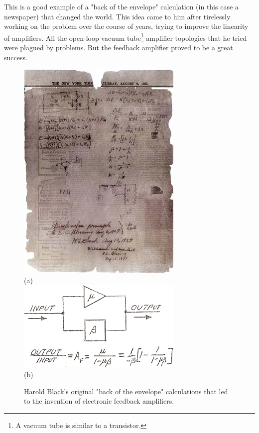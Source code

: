 This is a good example of a "back of the envelope" calculation (in this case a newspaper) that changed the world.  This idea came to him after tirelessly working on the problem over the course of years, trying to improve the linearity of amplifiers.  All the open-loop vacuum tube\footnote{A vacuum tube is similar to a transistor.} amplifier topologies that he tried were plagued by problems.  But the feedback amplifier proved to be a great success.
\newpage
\begin{figure}[H]
\centering
\includegraphics[width=.65\columnwidth]{image_1.jpg}\\
(a)\\[1cm]
\includegraphics[width=.55\columnwidth]{image_2.png}\\
(b)\\
\caption{Harold Black's original "back of the envelope" calculations that led to the invention of electronic feedback amplifiers.}
\label{fig:black_feedback}
\end{figure}
